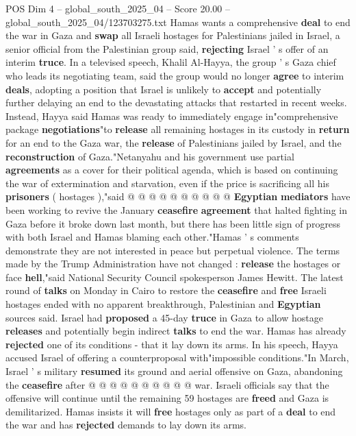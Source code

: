 \begin{textsample}{POS Dim 4 – global\_south\_2025\_04 – Score 20.00 – global\_south\_2025\_04/123703275.txt}  \label{ex:f4_pos_247}
Hamas wants a comprehensive \textbf{deal} to end the war in Gaza and \textbf{swap} all Israeli hostages for Palestinians jailed in Israel, a senior official from the Palestinian group said, \textbf{rejecting} Israel ' s offer of an interim \textbf{truce}.
In a televised speech, Khalil Al-Hayya, the group ' s Gaza chief who leads its negotiating team, said the group would no longer \textbf{agree} to interim \textbf{deals}, adopting a position that Israel is unlikely to \textbf{accept} and potentially further delaying an end to the devastating attacks that restarted in recent weeks.
Instead, Hayya said Hamas was ready to immediately engage in"comprehensive package \textbf{negotiations}"to \textbf{release} all remaining hostages in its custody in \textbf{return} for an end to the Gaza war, the \textbf{release} of Palestinians jailed by Israel, and the \textbf{reconstruction} of Gaza."Netanyahu and his government use partial \textbf{agreements} as a cover for their political agenda, which is based on continuing the war of extermination and starvation, even if the price is sacrificing all his \textbf{prisoners} ( hostages ),"said @ @ @ @ @ @ @ @ @ @ \textbf{Egyptian} \textbf{mediators} have been working to revive the January \textbf{ceasefire} \textbf{agreement} that halted fighting in Gaza before it broke down last month, but there has been little sign of progress with both Israel and Hamas blaming each other."Hamas ' s comments demonstrate they are not interested in peace but perpetual violence.
The terms made by the Trump Administration have not changed : \textbf{release} the hostages or face \textbf{hell},"said National Security Council spokesperson James Hewitt.
The latest round of \textbf{talks} on Monday in Cairo to restore the \textbf{ceasefire} and \textbf{free} Israeli hostages ended with no apparent breakthrough, Palestinian and \textbf{Egyptian} sources said.
Israel had \textbf{proposed} a 45-day \textbf{truce} in Gaza to allow hostage \textbf{releases} and potentially begin indirect \textbf{talks} to end the war.
Hamas has already \textbf{rejected} one of its conditions - that it lay down its arms.
In his speech, Hayya accused Israel of offering a counterproposal with"impossible conditions."In March, Israel ' s military \textbf{resumed} its ground and aerial offensive on Gaza, abandoning the \textbf{ceasefire} after @ @ @ @ @ @ @ @ @ @ war.
Israeli officials say that the offensive will continue until the remaining 59 hostages are \textbf{freed} and Gaza is demilitarized.
Hamas insists it will \textbf{free} hostages only as part of a \textbf{deal} to end the war and has \textbf{rejected} demands to lay down its arms.

\end{textsample}
